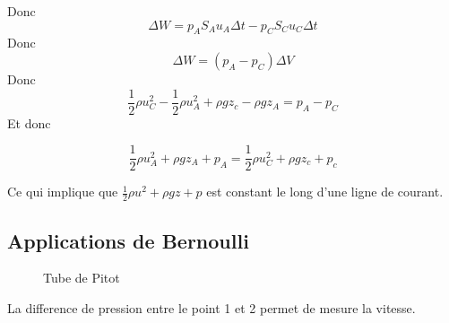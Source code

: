 \documentclass[../main.tex]{subfiles}
\begin{document}
Donc
\[ 
	\Delta W = p_A S_A u_A \Delta t - p_C S_C u_C \Delta t
\]
Donc
\[ 
	\Delta W = ( p_A - p_C ) \Delta V
\]
Donc
\[ 
	\frac{1}{2}\rho u_C^{2} - \frac{1}{2}\rho u_A ^{2} + \rho g z_c - \rho g z_A = p_A - p_C
\]
Et donc
\begin{thm}
\[ 
\frac{1}{2}\rho u_A ^{2} + \rho g z_A + p_A = \frac{1}{2}\rho u_C ^{2} + \rho g z_c + p_c
\]
\end{thm}
Ce qui implique que $\frac{1}{2}\rho u^{2} + \rho g z + p$ est constant le long d'une ligne de courant.
\subsection{Applications de Bernoulli}
\begin{figure}[ht]
    \centering
    \caption{Tube de Pitot}
    \label{fig:tube-de-pitot}
\end{figure}
La difference de pression entre le point 1 et 2 permet de mesure la vitesse.
\end{document}
